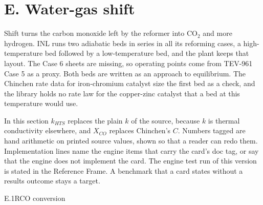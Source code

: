 \section{E. Water-gas shift}\label{sec:E}
Shift turns the carbon monoxide left by the reformer into CO$_2$ and more hydrogen. INL runs two adiabatic beds in series in all its reforming cases, a high-temperature bed followed by a low-temperature bed, and the plant keeps that layout. The Case 6 sheets are missing, so operating points come from TEV-961 Case 5 as a proxy. Both beds are written as an approach to equilibrium. The Chinchen rate data for iron-chromium catalyst size the first bed as a check, and the library holds no rate law for the copper-zinc catalyst that a bed at this temperature would use.

In this section $k_{HTS}$ replaces the plain $k$ of the source, because $k$ is thermal conductivity elsewhere, and $X_{CO}$ replaces Chinchen's $C$. Numbers tagged \tagC{} are hand arithmetic on printed source values, shown so that a reader can redo them. Implementation lines name the engine items that carry the card's doc tag, or say that the engine does not implement the card. The engine test run of this version is stated in the Reference Frame. A benchmark that a card states without a results outcome stays a target.

\begin{eqcard}{E.1}{R}{CO conversion}
\end{eqcard}

